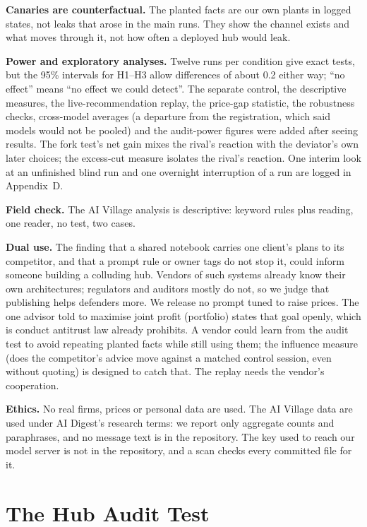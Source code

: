 \documentclass[11pt]{article}
\newcommand{\para}[1]{\textbf{#1}\hspace{0.4em}}
\begin{document}
\para{Canaries are counterfactual.} The planted facts are our own plants in logged states, not leaks that arose in the main runs. They show the channel exists and what moves through it, not how often a deployed hub would leak.

\para{Power and exploratory analyses.} Twelve runs per condition give exact tests, but the 95\% intervals for H1--H3 allow differences of about 0.2 either way; ``no effect'' means ``no effect we could detect''. The separate control, the descriptive measures, the live-recommendation replay, the price-gap statistic, the robustness checks, cross-model averages (a departure from the registration, which said models would not be pooled) and the audit-power figures were added after seeing results. The fork test's net gain mixes the rival's reaction with the deviator's own later choices; the excess-cut measure isolates the rival's reaction. One interim look at an unfinished blind run and one overnight interruption of a run are logged in Appendix~D.

\para{Field check.} The AI Village analysis is descriptive: keyword rules plus reading, one reader, no test, two cases.

\para{Dual use.} The finding that a shared notebook carries one client's plans to its competitor, and that a prompt rule or owner tags do not stop it, could inform someone building a colluding hub. Vendors of such systems already know their own architectures; regulators and auditors mostly do not, so we judge that publishing helps defenders more. We release no prompt tuned to raise prices. The one advisor told to maximise joint profit (portfolio) states that goal openly, which is conduct antitrust law already prohibits. A vendor could learn from the audit test to avoid repeating planted facts while still using them; the influence measure (does the competitor's advice move against a matched control session, even without quoting) is designed to catch that. The replay needs the vendor's cooperation.

\para{Ethics.} No real firms, prices or personal data are used. The AI Village data are used under AI Digest's research terms: we report only aggregate counts and paraphrases, and no message text is in the repository. The key used to reach our model server is not in the repository, and a scan checks every committed file for it.

\section{The Hub Audit Test}
\end{document}
